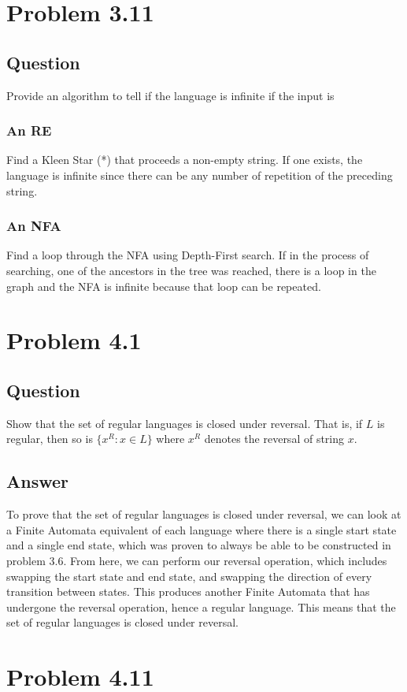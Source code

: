 \documentclass[12pt, a4paper]{article}
\begin{document}
\section{Problem 3.11}
\subsection{Question}
Provide an algorithm to tell if the language is infinite if the input is
\subsubsection{An RE}
Find a Kleen Star (*) that proceeds a non-empty string. If one exists, the language is infinite since there can be any number of repetition of the preceding string.
\subsubsection{An NFA}
Find a loop through the NFA using Depth-First search. If in the process of searching, one of the ancestors in the tree was reached, there is a loop in the graph and the NFA is infinite because that loop can be repeated.

\section{Problem 4.1}
\subsection{Question}
Show that the set of regular languages is closed under reversal. That is, if $L$ is regular, then so is $\{x^{R} : x \in L\}$ where $x^{R}$ denotes the reversal of string $x$.
\subsection{Answer}
To prove that the set of regular languages is closed under reversal, we can look at a Finite Automata equivalent of each language where there is a single start state and a single end state, which was proven to always be able to be constructed in problem 3.6. From here, we can perform our reversal operation, which includes swapping the start state and end state, and swapping the direction of every transition between states. This produces another Finite Automata that has undergone the reversal operation, hence a regular language. This means that the set of regular languages is closed under reversal.

\section{Problem 4.11}
\end{document}

